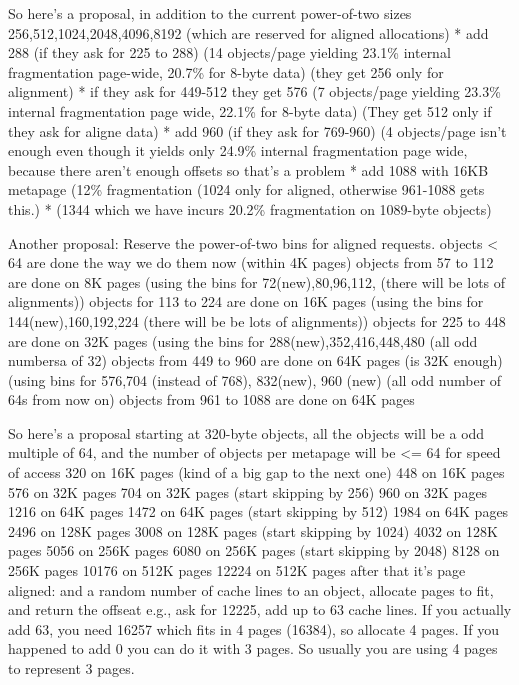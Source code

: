 \begin{enumerate}
     So here's a proposal, in addition to the current power-of-two sizes 256,512,1024,2048,4096,8192 (which are reserved for aligned allocations)
       * add 288 (if they ask for 225 to 288) (14 objects/page yielding 23.1\% internal fragmentation page-wide, 20.7\% for 8-byte data) (they get 256 only for alignment)
       * if they ask for 449-512 they get 576 (7 objects/page yielding 23.3\% internal fragmentation page wide, 22.1\% for 8-byte data)   (They get 512 only if they ask for aligne data)
       * add 960 (if they ask for 769-960) (4 objects/page isn't enough even though it yields only 24.9\% internal fragmentation page wide, because there aren't enough offsets
           so that's a problem
       * add 1088 with 16KB metapage (12\% fragmentation (1024 only for aligned, otherwise 961-1088 gets this.)
       * (1344 which we have incurs 20.2\% fragmentation on 1089-byte objects)
       
     Another proposal: Reserve the power-of-two bins for aligned requests.
       objects < 64 are done the way we do them now (within 4K pages)
       objects from 57 to 112 are done on 8K pages (using the bins for 72(new),80,96,112, (there will be lots of alignments))
       objects for 113 to 224 are done on 16K pages (using the bins for 144(new),160,192,224 (there will be be lots of alignments))
       objects for 225 to 448 are done on 32K pages (using the bins for 288(new),352,416,448,480 (all odd numbersa of 32)
       objects from 449 to 960 are done on 64K pages (is 32K enough) (using bins for 576,704 (instead of 768), 832(new), 960 (new) (all  odd number of 64s from now on)
       objects from 961 to 1088 are done on 64K pages

     So here's a proposal
        starting at 320-byte objects, all the objects will be a odd multiple of 64, and the number of objects per metapage will be <= 64 for speed of access
        320 on 16K pages (kind of a big gap to the next one)
        448 on 16K pages
        576 on 32K pages
        704 on 32K pages   (start skipping by 256)
        960 on 32K pages
        1216 on 64K pages 
        1472 on 64K pages  (start skipping by 512)
        1984 on 64K pages
        2496 on 128K pages
        3008 on 128K pages (start skipping by 1024)
        4032 on 128K pages
        5056 on 256K pages
        6080 on 256K pages (start skipping by 2048)
        8128 on 256K pages
        10176 on 512K pages
        12224 on 512K pages
        after that it's page aligned: and a random number of cache lines to an object, allocate pages to fit, and return the offseat
         e.g., ask for 12225, add up to 63 cache lines.  If you actually add 63, you need 16257 which fits in 4 pages (16384), so allocate 4 pages.
          If you happened to add 0 you can do it with 3 pages.  So usually you are using 4 pages to represent 3 pages.  
        

\end{enumerate}
